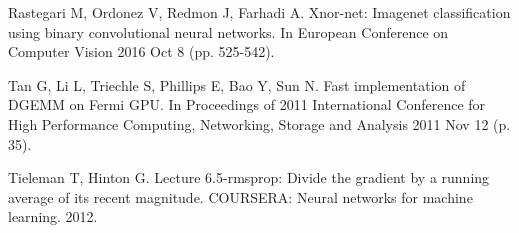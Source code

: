 \documentclass[conference,compsoc]{IEEEtran}
\begin{document}
\begin{thebibliography}{99}





\bibitem{}
Rastegari M, Ordonez V, Redmon J, Farhadi A. Xnor-net: Imagenet classification using binary convolutional neural networks. In European Conference on Computer Vision 2016 Oct 8 (pp. 525-542). 
\label{refXnor}









\bibitem{}
Tan G, Li L, Triechle S, Phillips E, Bao Y, Sun N. Fast implementation of DGEMM on Fermi GPU. In Proceedings of 2011 International Conference for High Performance Computing, Networking, Storage and Analysis 2011 Nov 12 (p. 35).
\label{refDGEMM}

\bibitem{}
Tieleman T, Hinton G. Lecture 6.5-rmsprop: Divide the gradient by a running average of its recent magnitude. COURSERA: Neural networks for machine learning. 2012.
\label{refRMSprop}






\end{thebibliography}
\end{document}
